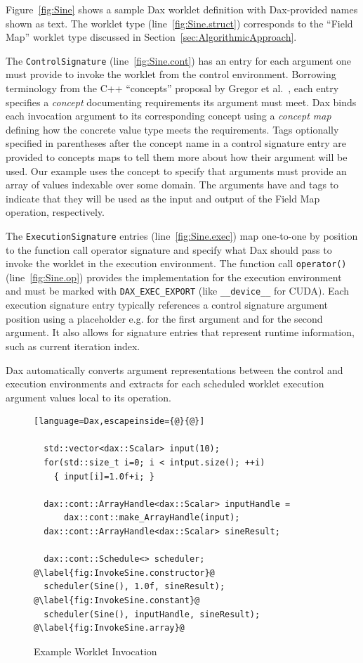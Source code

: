 \documentclass[conference]{IEEEtran}
\newcommand*{\scite}[1]{~\cite{#1}}
\newcommand{\etal}{et al.}
\newcommand{\Ci}[1]{\color{blue}{#1}} %
\newcommand{\CiDesc}{\Ci{Blue}}
\newcommand{\Code}[1]{{\small\texttt{#1}}}
\begin{document}
Figure~\ref{fig:Sine} shows a sample Dax worklet definition with
Dax-provided names shown as \Code{\CiDesc} text.
%
The worklet type \Code{\Ci{WorkletMapField}}
(line~\ref{fig:Sine.struct}) corresponds to the ``Field Map'' worklet
type discussed in Section~\ref{sec:AlgorithmicApproach}.

The \Code{ControlSignature} (line~\ref{fig:Sine.cont}) has an entry
for each argument one must provide to invoke the worklet from the
control environment.
%
Borrowing terminology from the C++ ``concepts'' proposal by Gregor
\etal\scite{Gregor2006}, each entry specifies a \emph{concept}
documenting requirements its argument must meet.
%
Dax binds each invocation argument to its corresponding concept using
a \emph{concept map} defining how the concrete value type meets the
requirements.
%
Tags optionally specified in parentheses after the concept name in a
control signature entry are provided to concepts maps to tell them
more about how their argument will be used.
%
Our example uses the \Code{\Ci{Field}} concept to specify that
arguments must provide an array of values indexable over some domain.
%
The arguments have \Code{\Ci{In}} and \Code{\Ci{Out}} tags to indicate
that they will be used as the input and output of the Field Map
operation, respectively.

The \Code{ExecutionSignature} entries (line~\ref{fig:Sine.exec}) map
one-to-one by position to the function call operator signature and
specify what Dax should pass to invoke the worklet in the execution
environment.
%
The function call \Code{operator()} (line~\ref{fig:Sine.op}) provides
the implementation for the execution environment and must be marked
with \Code{DAX\_EXEC\_EXPORT} (like \Code{\_\_device\_\_} for CUDA).
%
Each execution signature entry typically references a control
signature argument position using a placeholder e.g. \Code{\Ci{\_1}}
for the first argument and \Code{\Ci{\_2}} for the second argument.
It also allows for signature entries that represent runtime information,
such as current iteration index.


Dax automatically converts argument representations between the
control and execution environments and extracts for each scheduled
worklet execution argument values local to its operation.

\begin{figure}[ht]
  \centering
  \begin{lstlisting}[language=Dax,escapeinside={@}{@}]

  std::vector<dax::Scalar> input(10);
  for(std::size_t i=0; i < intput.size(); ++i)
    { input[i]=1.0f+i; }

  dax::cont::ArrayHandle<dax::Scalar> inputHandle =
      dax::cont::make_ArrayHandle(input);
  dax::cont::ArrayHandle<dax::Scalar> sineResult;

  dax::cont::Schedule<> scheduler; @\label{fig:InvokeSine.constructor}@
  scheduler(Sine(), 1.0f, sineResult); @\label{fig:InvokeSine.constant}@
  scheduler(Sine(), inputHandle, sineResult); @\label{fig:InvokeSine.array}@

  \end{lstlisting}
  \caption{Example Worklet Invocation}
  \label{fig:InvokeSine}
\end{figure}
\end{document}
